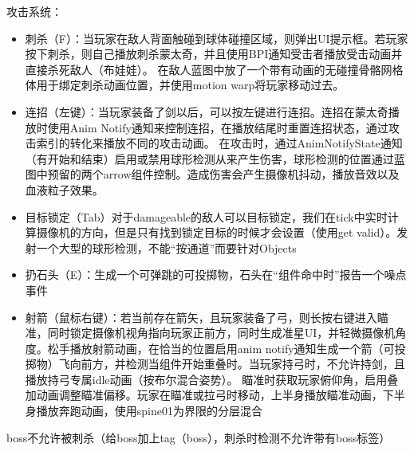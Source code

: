 \documentclass[11pt,oneside]{book}
\begin{document}
攻击系统：
\begin{itemize}
    \item  刺杀（F）：当玩家在敌人背面触碰到球体碰撞区域，则弹出UI提示框。若玩家按下刺杀，则自己播放刺杀蒙太奇，并且使用BPI通知受击者播放受击动画并直接杀死敌人（布娃娃）。
    在敌人蓝图中放了一个带有动画的无碰撞骨骼网格体用于绑定刺杀动画位置，并使用motion warp将玩家移动过去。
    \item  连招（左键）：当玩家装备了剑以后，可以按左键进行连招。连招在蒙太奇播放时使用Anim Notify通知来控制连招，在播放结尾时重置连招状态，通过攻击索引的转化来播放不同的攻击动画。
           在攻击时，通过AnimNotifyState通知（有开始和结束）启用或禁用球形检测从来产生伤害，球形检测的位置通过蓝图中预留的两个arrow组件控制。造成伤害会产生摄像机抖动，播放音效以及血液粒子效果。
    \item  目标锁定（Tab）对于damageable的敌人可以目标锁定，我们在tick中实时计算摄像机的方向，但是只有找到锁定目标的时候才会设置（使用get valid）。发射一个大型的球形检测，不能“按通道”而要针对Objects
    \item  扔石头（E）：生成一个可弹跳的可投掷物，石头在“组件命中时”报告一个噪点事件
    \item  射箭（鼠标右键）：若当前存在箭矢，且玩家装备了弓，则长按右键进入瞄准，同时锁定摄像机视角指向玩家正前方，同时生成准星UI，并轻微摄像机角度。松手播放射箭动画，在恰当的位置启用anim notify通知生成一个箭（可投掷物）飞向前方，并检测当组件开始重叠时。当玩家持弓时，不允许持剑，且播放持弓专属idle动画（按布尔混合姿势）。
    瞄准时获取玩家俯仰角，启用叠加动画调整瞄准偏移。玩家在瞄准或拉弓时移动，上半身播放瞄准动画，下半身播放奔跑动画，使用spine01为界限的分层混合
\end{itemize}

boss不允许被刺杀（给boss加上tag（boss），刺杀时检测不允许带有boss标签）
\end{document}
